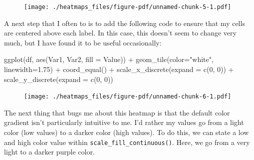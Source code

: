 \documentclass[
  letterpaper,
  DIV=11,
  numbers=noendperiod]{scrreprt}
\newenvironment{Shaded}{\begin{snugshade}}{\end{snugshade}}
\newcommand{\AttributeTok}[1]{\textcolor[rgb]{0.40,0.45,0.13}{#1}}
\newcommand{\DecValTok}[1]{\textcolor[rgb]{0.68,0.00,0.00}{#1}}
\newcommand{\FloatTok}[1]{\textcolor[rgb]{0.68,0.00,0.00}{#1}}
\newcommand{\FunctionTok}[1]{\textcolor[rgb]{0.28,0.35,0.67}{#1}}
\newcommand{\NormalTok}[1]{\textcolor[rgb]{0.00,0.23,0.31}{#1}}
\newcommand{\SpecialCharTok}[1]{\textcolor[rgb]{0.37,0.37,0.37}{#1}}
\newcommand{\StringTok}[1]{\textcolor[rgb]{0.13,0.47,0.30}{#1}}
\begin{document}
\begin{figure}[H]

{\centering \texttt{[image: ./heatmaps\_files/figure-pdf/unnamed-chunk-5-1.pdf]}

}

\end{figure}

A next step that I often to is to add the following code to ensure that
my cells are centered above each label. In this case, this doesn't seem
to change very much, but I have found it to be useful occasionally:

\begin{Shaded}
\begin{Highlighting}[]
\FunctionTok{ggplot}\NormalTok{(df, }\FunctionTok{aes}\NormalTok{(Var1, Var2, }\AttributeTok{fill =}\NormalTok{ Value)) }\SpecialCharTok{+} 
  \FunctionTok{geom\_tile}\NormalTok{(}\AttributeTok{color=}\StringTok{"white"}\NormalTok{, }\AttributeTok{linewidth=}\FloatTok{1.75}\NormalTok{) }\SpecialCharTok{+}
  \FunctionTok{coord\_equal}\NormalTok{() }\SpecialCharTok{+}
  \FunctionTok{scale\_x\_discrete}\NormalTok{(}\AttributeTok{expand =} \FunctionTok{c}\NormalTok{(}\DecValTok{0}\NormalTok{, }\DecValTok{0}\NormalTok{)) }\SpecialCharTok{+}
  \FunctionTok{scale\_y\_discrete}\NormalTok{(}\AttributeTok{expand =} \FunctionTok{c}\NormalTok{(}\DecValTok{0}\NormalTok{, }\DecValTok{0}\NormalTok{)) }
\end{Highlighting}
\end{Shaded}

\begin{figure}[H]

{\centering \texttt{[image: ./heatmaps\_files/figure-pdf/unnamed-chunk-6-1.pdf]}

}

\end{figure}

The next thing that bugs me about this heatmap is that the default color
gradient isn't particularly intuitive to me. I'd rather my values go
from a light color (low values) to a darker color (high values). To do
this, we can state a low and high color value within
\texttt{scale\_fill\_continuous()}. Here, we go from a very light to a
darker purple color.
\end{document}
